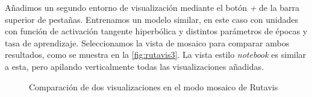 Añadimos un segundo entorno de visualización mediante el botón \emph{+} de la barra superior de pestañas. Entrenamos un modelo similar, en este caso con unidades con función de activación tangente hiperbólica y distintos parámetros de épocas y tasa de aprendizaje. Seleccionamos la vista de mosaico para comparar ambos resultados, como se muestra en la \autoref{fig:rutavis3}. La vista estilo \emph{notebook} es similar a esta, pero apilando verticalmente todas las visualizaciones añadidas.

\begin{figure}[hbtp]
  \centering
  \caption[Modo mosaico de Rutavis]{Comparación de dos visualizaciones en el modo mosaico de Rutavis}
  \label{fig:rutavis3}
\end{figure}